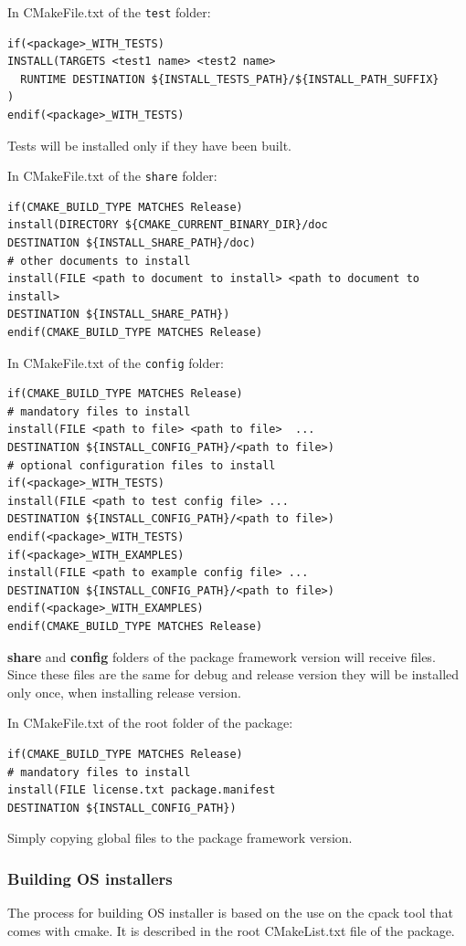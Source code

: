\documentclass[12pt,a4paper]{article}
\begin{document}
In CMakeFile.txt of the \texttt{test} folder:
\begin{verbatim}
if(<package>_WITH_TESTS)
INSTALL(TARGETS <test1 name> <test2 name>
  RUNTIME DESTINATION ${INSTALL_TESTS_PATH}/${INSTALL_PATH_SUFFIX}
)
endif(<package>_WITH_TESTS)
\end{verbatim}
Tests will be installed only if they have been built.

In CMakeFile.txt of the \texttt{share} folder:
\begin{verbatim}
if(CMAKE_BUILD_TYPE MATCHES Release)
install(DIRECTORY ${CMAKE_CURRENT_BINARY_DIR}/doc 
DESTINATION ${INSTALL_SHARE_PATH}/doc)
# other documents to install
install(FILE <path to document to install> <path to document to install>
DESTINATION ${INSTALL_SHARE_PATH})
endif(CMAKE_BUILD_TYPE MATCHES Release)
\end{verbatim}

In CMakeFile.txt of the \texttt{config} folder:
\begin{verbatim}
if(CMAKE_BUILD_TYPE MATCHES Release)
# mandatory files to install
install(FILE <path to file> <path to file>  ...
DESTINATION ${INSTALL_CONFIG_PATH}/<path to file>)
# optional configuration files to install
if(<package>_WITH_TESTS)
install(FILE <path to test config file> ...
DESTINATION ${INSTALL_CONFIG_PATH}/<path to file>)
endif(<package>_WITH_TESTS)
if(<package>_WITH_EXAMPLES)
install(FILE <path to example config file> ...
DESTINATION ${INSTALL_CONFIG_PATH}/<path to file>)
endif(<package>_WITH_EXAMPLES)
endif(CMAKE_BUILD_TYPE MATCHES Release)
\end{verbatim}
\textbf{share} and \textbf{config} folders of the package framework version will receive files. Since these files are the same for debug and release version they will be installed only once, when installing release version.

In CMakeFile.txt of the root folder of the package:
\begin{verbatim}
if(CMAKE_BUILD_TYPE MATCHES Release)
# mandatory files to install
install(FILE license.txt package.manifest
DESTINATION ${INSTALL_CONFIG_PATH})
\end{verbatim}
Simply copying global files to the package framework version.


\subsubsection{Building OS installers}

The process for building OS installer is based on the use on the cpack tool that comes with cmake. It is described in the root CMakeList.txt file of the package.
\end{document}
